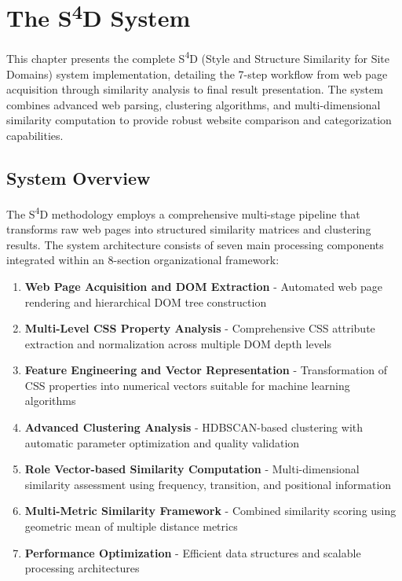 \chapter{The S\textsuperscript{4}D System}
\label{ch:s4d-system}

This chapter presents the complete S\textsuperscript{4}D (Style and Structure Similarity for Site Domains) system implementation, detailing the 7-step workflow from web page acquisition through similarity analysis to final result presentation. The system combines advanced web parsing, clustering algorithms, and multi-dimensional similarity computation to provide robust website comparison and categorization capabilities.

\section{System Overview}
\label{sec:system-overview}

The S\textsuperscript{4}D methodology employs a comprehensive multi-stage pipeline that transforms raw web pages into structured similarity matrices and clustering results. The system architecture consists of seven main processing components integrated within an 8-section organizational framework:

\begin{enumerate}
    \item \textbf{Web Page Acquisition and DOM Extraction} - Automated web page rendering and hierarchical DOM tree construction
    \item \textbf{Multi-Level CSS Property Analysis} - Comprehensive CSS attribute extraction and normalization across multiple DOM depth levels
    \item \textbf{Feature Engineering and Vector Representation} - Transformation of CSS properties into numerical vectors suitable for machine learning algorithms
    \item \textbf{Advanced Clustering Analysis} - HDBSCAN-based clustering with automatic parameter optimization and quality validation
    \item \textbf{Role Vector-based Similarity Computation} - Multi-dimensional similarity assessment using frequency, transition, and positional information
    \item \textbf{Multi-Metric Similarity Framework} - Combined similarity scoring using geometric mean of multiple distance metrics
    \item \textbf{Performance Optimization} - Efficient data structures and scalable processing architectures
\end{enumerate}

